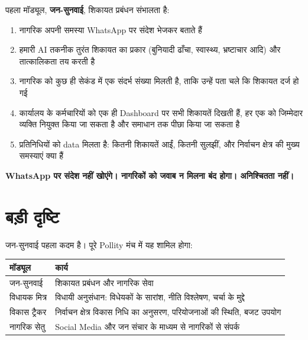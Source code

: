 \documentclass[11pt, a4paper]{article}
\begin{document}
\vspace{0.8em}

पहला मॉड्यूल, \textbf{जन-सुनवाई}, शिकायत प्रबंधन संभालता है:

\begin{enumerate}[leftmargin=1.5em, itemsep=4pt]
  \item नागरिक अपनी समस्या \textenglish{WhatsApp} पर संदेश भेजकर बताते हैं
  \item हमारी \textenglish{AI} तकनीक तुरंत शिकायत का प्रकार (बुनियादी ढाँचा, स्वास्थ्य, भ्रष्टाचार आदि) और तात्कालिकता तय करती है
  \item नागरिक को कुछ ही सेकंड में एक संदर्भ संख्या मिलती है, ताकि उन्हें पता चले कि शिकायत दर्ज हो गई
  \item कार्यालय के कर्मचारियों को एक ही \textenglish{Dashboard} पर सभी शिकायतें दिखती हैं, हर एक को जिम्मेदार व्यक्ति नियुक्त किया जा सकता है और समाधान तक पीछा किया जा सकता है
  \item प्रतिनिधियों को \textenglish{data} मिलता है: कितनी शिकायतें आईं, कितनी सुलझीं, और निर्वाचन क्षेत्र की मुख्य समस्याएं क्या हैं
\end{enumerate}

\vspace{0.5em}

\textbf{\textenglish{WhatsApp} पर संदेश नहीं खोएंगे। नागरिकों को जवाब न मिलना बंद होगा। अनिश्चितता नहीं।}

\section{बड़ी दृष्टि}

जन-सुनवाई पहला कदम है। पूरे \textenglish{Pollity} मंच में यह शामिल होगा:

\begin{tabularx}{\linewidth}{lX}
\toprule
\textbf{मॉड्यूल} & \textbf{कार्य} \\
\midrule
जन-सुनवाई    & शिकायत प्रबंधन और नागरिक सेवा \\
विधायक मित्र & विधायी अनुसंधान: विधेयकों के सारांश, नीति विश्लेषण, चर्चा के मुद्दे \\
विकास ट्रैकर & निर्वाचन क्षेत्र विकास निधि का अनुसरण, परियोजनाओं की स्थिति, बजट उपयोग \\
नागरिक सेतु  & \textenglish{Social Media} और जन संचार के माध्यम से नागरिकों से संपर्क \\
\bottomrule
\end{tabularx}
\end{document}
